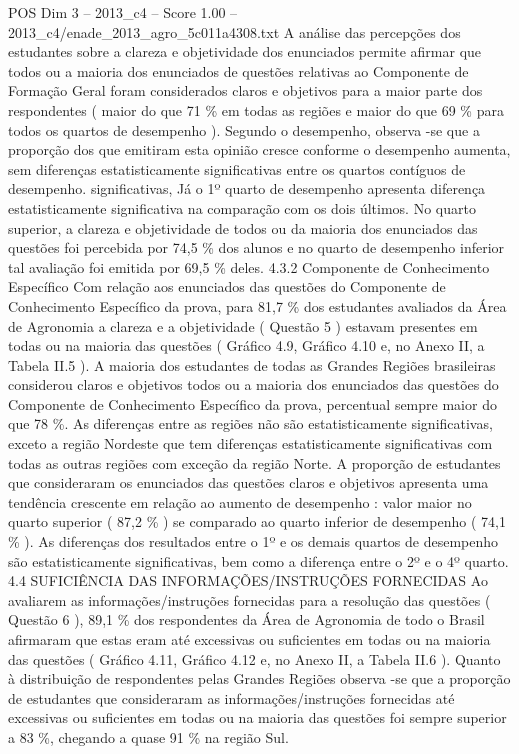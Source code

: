 \begin{textsample}{POS Dim 3 – 2013\_c4 – Score 1.00 – 2013\_c4/enade\_2013\_agro\_5c011a4308.txt}
A análise das percepções dos estudantes sobre a clareza e objetividade dos enunciados permite afirmar que todos ou a maioria dos enunciados de questões relativas ao Componente de Formação Geral foram considerados claros e objetivos para a maior parte dos respondentes ( maior do que 71 \% em todas as regiões e maior do que 69 \% para todos os quartos de desempenho ).
Segundo o desempenho, observa -se que a proporção dos que emitiram esta opinião cresce conforme o desempenho aumenta, sem diferenças estatisticamente significativas entre os quartos contíguos de desempenho. significativas, Já o 1º quarto de desempenho apresenta diferença estatisticamente significativa na comparação com os dois últimos.
No quarto superior, a clareza e objetividade de todos ou da maioria dos enunciados das questões foi percebida por 74,5 \% dos alunos e no quarto de desempenho inferior tal avaliação foi emitida por 69,5 \% deles. 4.3.2 Componente de Conhecimento Específico Com relação aos enunciados das questões do Componente de Conhecimento Específico da prova, para 81,7 \% dos estudantes avaliados da Área de Agronomia a clareza e a objetividade ( Questão 5 ) estavam presentes em todas ou na maioria das questões ( Gráfico 4.9, Gráfico 4.10 e, no Anexo II, a Tabela II.5 ).
A maioria dos estudantes de todas as Grandes Regiões brasileiras considerou claros e objetivos todos ou a maioria dos enunciados das questões do Componente de Conhecimento Específico da prova, percentual sempre maior do que 78 \%.
As diferenças entre as regiões não são estatisticamente significativas, exceto a região Nordeste que tem diferenças estatisticamente significativas com todas as outras regiões com exceção da região Norte.
A proporção de estudantes que consideraram os enunciados das questões claros e objetivos apresenta uma tendência crescente em relação ao aumento de desempenho : valor maior no quarto superior ( 87,2 \% ) se comparado ao quarto inferior de desempenho ( 74,1 \% ).
As diferenças dos resultados entre o 1º e os demais quartos de desempenho são estatisticamente significativas, bem como a diferença entre o 2º e o 4º quarto. 4.4 SUFICIÊNCIA DAS INFORMAÇÕES/INSTRUÇÕES FORNECIDAS Ao avaliarem as informações/instruções fornecidas para a resolução das questões ( Questão 6 ), 89,1 \% dos respondentes da Área de Agronomia de todo o Brasil afirmaram que estas eram até excessivas ou suficientes em todas ou na maioria das questões ( Gráfico 4.11, Gráfico 4.12 e, no Anexo II, a Tabela II.6 ).
Quanto à distribuição de respondentes pelas Grandes Regiões observa -se que a proporção de estudantes que consideraram as informações/instruções fornecidas até excessivas ou suficientes em todas ou na maioria das questões foi sempre superior a 83 \%, chegando a quase 91 \% na região Sul.

\end{textsample}
